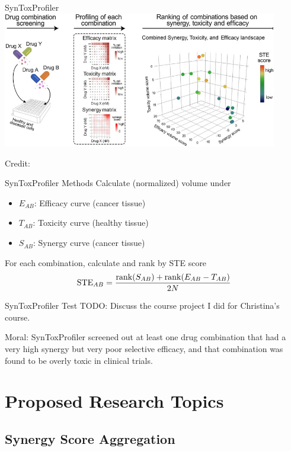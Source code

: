 \documentclass{beamer}
\begin{document}
\begin{frame}{SynToxProfiler}
    \centering
    \includegraphics[width=0.9\textwidth]{figs/syntoxprofiler.jpg}

    \hspace*{15pt}\hbox{\scriptsize Credit:}
\end{frame}


\begin{frame}{SynToxProfiler Methods}
    Calculate (normalized) volume under 
    \begin{itemize}
        \item $E_{AB}$: Efficacy curve (cancer tissue)
        \item $T_{AB}$: Toxicity curve (healthy tissue)
        \item $S_{AB}$: Synergy curve (cancer tissue)
    \end{itemize}
    \vfill
    For each combination, calculate and rank by STE score 
    \[
        {\rm STE}_{AB} = \frac{{\rm rank}(S_{AB}) + {\rm rank}(E_{AB} - T_{AB})}{2N}
    \]
\end{frame}

\begin{frame}{SynToxProfiler Test}
  TODO: Discuss the course project I did for Christina's course.

  \vfill

  Moral: SynToxProfiler screened out at least one drug combination that had a very high synergy but very poor selective efficacy, and that combination was found to be overly toxic in clinical trials.
\end{frame}

\section{Proposed Research Topics}

\subsection{Synergy Score Aggregation}
\end{document}
